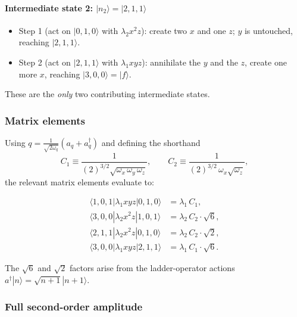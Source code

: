 \paragraph{Intermediate state 2: $|n_2\rangle = |2,1,1\rangle$}
\begin{itemize}
  \item Step 1 (act on $|0,1,0\rangle$ with $\lambda_2 x^2 z$): create two $x$ and one $z$; $y$ is untouched, reaching $|2,1,1\rangle$.
  \item Step 2 (act on $|2,1,1\rangle$ with $\lambda_1 xyz$): annihilate the $y$ and the $z$, create one more $x$, reaching $|3,0,0\rangle = |f\rangle$.
\end{itemize}

These are the \emph{only} two contributing intermediate states.

\subsubsection*{Matrix elements}

Using $q = \frac{1}{\sqrt{2\omega_q}}(a_q + a_q^\dagger)$ and defining the shorthand
\begin{equation}
  C_1 \equiv \frac{1}{(2)^{3/2}\sqrt{\omega_x\,\omega_y\,\omega_z}},
  \qquad
  C_2 \equiv \frac{1}{(2)^{3/2}\,\omega_x\sqrt{\omega_z}},
  \label{eq:lec04:C1-C2}
\end{equation}
the relevant matrix elements evaluate to:

\begin{align}
  \langle 1,0,1 | \lambda_1 xyz | 0,1,0 \rangle
  &= \lambda_1\, C_1,
  \label{eq:lec04:me1a}\\
  \langle 3,0,0 | \lambda_2 x^2 z | 1,0,1 \rangle
  &= \lambda_2\, C_2 \cdot \sqrt{6},
  \label{eq:lec04:me1b}\\
  \langle 2,1,1 | \lambda_2 x^2 z | 0,1,0 \rangle
  &= \lambda_2\, C_2 \cdot \sqrt{2},
  \label{eq:lec04:me2a}\\
  \langle 3,0,0 | \lambda_1 xyz | 2,1,1 \rangle
  &= \lambda_1\, C_1 \cdot \sqrt{6}.
  \label{eq:lec04:me2b}
\end{align}

The $\sqrt{6}$ and $\sqrt{2}$ factors arise from the ladder-operator actions $a^\dagger|n\rangle = \sqrt{n+1}|n+1\rangle$.

\subsubsection*{Full second-order amplitude}

